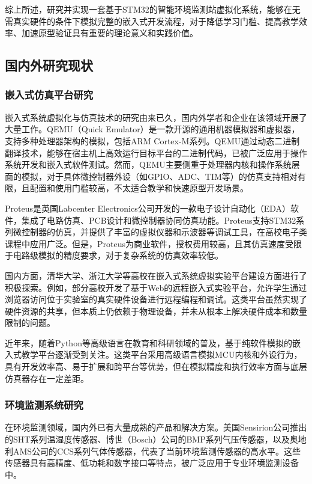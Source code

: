 \documentclass[12pt,a4paper]{ctexart}
\begin{document}
综上所述，研究并实现一套基于STM32的智能环境监测站虚拟化系统，能够在无需真实硬件的条件下模拟完整的嵌入式开发流程，对于降低学习门槛、提高教学效率、加速原型验证具有重要的理论意义和实践价值。

\subsection{国内外研究现状}

\subsubsection{嵌入式仿真平台研究}

嵌入式系统虚拟化与仿真技术的研究由来已久，国内外学者和企业在该领域开展了大量工作。QEMU（Quick Emulator）是一款开源的通用机器模拟器和虚拟器，支持多种处理器架构的模拟，包括ARM Cortex-M系列。QEMU通过动态二进制翻译技术，能够在宿主机上高效运行目标平台的二进制代码，已被广泛应用于操作系统开发和嵌入式软件测试。然而，QEMU主要侧重于处理器内核和操作系统层面的模拟，对于具体微控制器外设（如GPIO、ADC、TIM等）的仿真支持相对有限，且配置和使用门槛较高，不太适合教学和快速原型开发场景。

Proteus是英国Labcenter Electronics公司开发的一款电子设计自动化（EDA）软件，集成了电路仿真、PCB设计和微控制器协同仿真功能。Proteus支持STM32系列微控制器的仿真，并提供了丰富的虚拟仪器和示波器等调试工具，在高校电子类课程中应用广泛。但是，Proteus为商业软件，授权费用较高，且其仿真速度受限于电路级模拟的精度要求，对于复杂系统的仿真效率较低。

国内方面，清华大学、浙江大学等高校在嵌入式系统虚拟实验平台建设方面进行了积极探索。例如，部分高校开发了基于Web的远程嵌入式实验平台，允许学生通过浏览器访问位于实验室的真实硬件设备进行远程编程和调试。这类平台虽然实现了硬件资源的共享，但本质上仍依赖于物理设备，并未从根本上解决硬件成本和数量限制的问题。

近年来，随着Python等高级语言在教育和科研领域的普及，基于纯软件模拟的嵌入式教学平台逐渐受到关注。这类平台采用高级语言模拟MCU内核和外设行为，具有开发效率高、易于扩展和跨平台等优势，但在模拟精度和执行效率方面与底层仿真器存在一定差距。

\subsubsection{环境监测系统研究}

在环境监测领域，国内外已有大量成熟的产品和解决方案。美国Sensirion公司推出的SHT系列温湿度传感器、博世（Bosch）公司的BMP系列气压传感器，以及奥地利AMS公司的CCS系列气体传感器，代表了当前环境监测传感器的高水平。这些传感器具有高精度、低功耗和数字接口等特点，被广泛应用于专业环境监测设备中。
\end{document}

